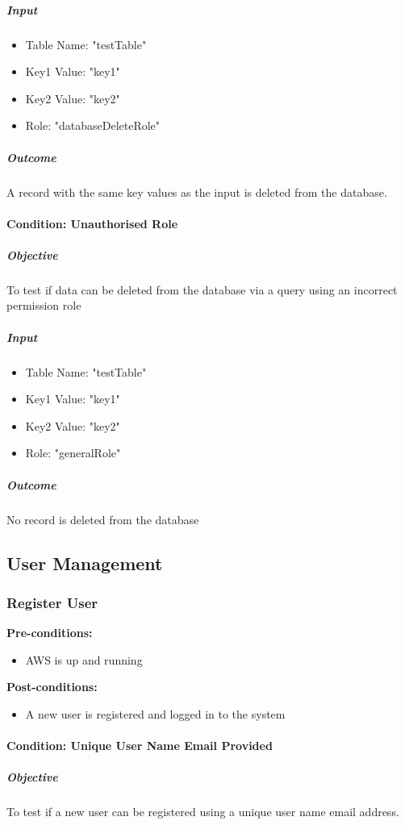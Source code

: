 \documentclass{article}
\begin{document}
				\subparagraph{Input}
				\begin{itemize}
					\item Table Name: "testTable"
					\item Key1 Value: "key1"
					\item Key2 Value: "key2"
					\item Role: "databaseDeleteRole"
				\end{itemize}
				
				\subparagraph{Outcome}
					A record with the same key values as the input is deleted from the database.
				
				\paragraph{Condition: Unauthorised Role}
				\subparagraph{Objective}
					To test if data can be deleted from the database via a query using an incorrect permission role
				
				\subparagraph{Input}
				\begin{itemize}
					\item Table Name: "testTable"
					\item Key1 Value: "key1"
					\item Key2 Value: "key2"
					\item Role: "generalRole"
				\end{itemize}
				
				\subparagraph{Outcome}
				No record is deleted from the database
	
	\subsection{User Management}
		\subsubsection{Register User}
			\textbf{Pre-conditions:}
			\begin{itemize}
				\item AWS is up and running
			\end{itemize}
			\textbf{Post-conditions:}
			\begin{itemize}
				\item A new user is registered and logged in to the system
			\end{itemize}
			
			\paragraph{Condition: Unique User Name Email Provided}
				\subparagraph{Objective}
					To test if a new user can be registered using a unique user name email address.
					
\end{document}
